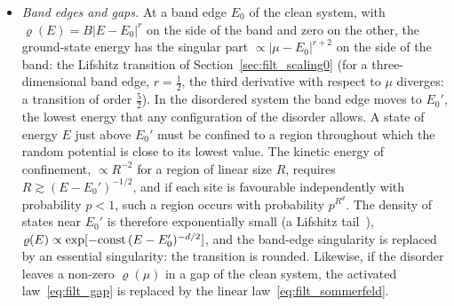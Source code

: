 \documentclass[10pt,a4paper]{article}
\theoremstyle{plain}
\begin{document}
\begin{itemize}\setlength{\itemsep}{2pt}
\item \emph{Band edges and gaps.} At a band edge $E_0$ of the clean system,
  with $\varrho(E)=B|E-E_0|^{r}$ on the side of the band and zero on the
  other, the ground-state energy has the singular part
  $\propto|\mu-E_0|^{r+2}$ on the side of the band: the Lifshitz
  transition of Section~\ref{sec:filt_scaling0} (for a three-dimensional band edge,
  $r=\tfrac12$, the third derivative with respect to $\mu$ diverges: a
  transition of order $\tfrac52$). In the disordered system the band edge moves to $E_0'$, the
  lowest energy that any configuration of the disorder allows. A state of
  energy $E$ just above $E_0'$ must be confined to a region throughout which
  the random potential is close to its lowest value. The kinetic energy of
  confinement, $\propto R^{-2}$ for a region of linear size $R$, requires
  $R\gtrsim(E-E_0')^{-1/2}$, and if each site is favourable independently
  with probability $p<1$, such a region occurs with probability $p^{R^{d}}$.
  The density of states near $E_0'$ is therefore exponentially small (a
  Lifshitz tail~\cite{Lifshitz1964}),
  $\varrho(E)\propto\exp[-{\rm const}\,(E-E_0')^{-d/2}]$, and the band-edge
  singularity is replaced by an essential singularity: the transition is
  rounded. Likewise, if the disorder leaves a non-zero $\varrho(\mu)$ in a
  gap of the clean system, the activated law~\eqref{eq:filt_gap} is replaced
  by the linear law~\eqref{eq:filt_sommerfeld}.


\end{itemize}
\end{document}
